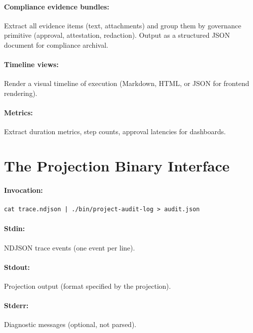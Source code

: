\paragraph{Compliance evidence bundles:}
Extract all evidence items (text, attachments) and group them by governance
primitive (approval, attestation, redaction). Output as a structured JSON
document for compliance archival.

\paragraph{Timeline views:}
Render a visual timeline of execution (Markdown, HTML, or JSON for frontend
rendering).

\paragraph{Metrics:}
Extract duration metrics, step counts, approval latencies for dashboards.

\section{The Projection Binary Interface}
\label{sec:projection-interface}

\paragraph{Invocation:}

\begin{verbatim}
cat trace.ndjson | ./bin/project-audit-log > audit.json
\end{verbatim}

\paragraph{Stdin:} NDJSON trace events (one event per line).

\paragraph{Stdout:} Projection output (format specified by the projection).

\paragraph{Stderr:} Diagnostic messages (optional, not parsed).

